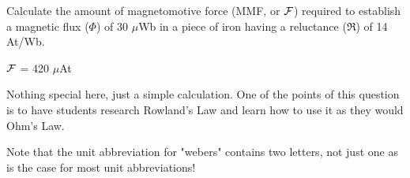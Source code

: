 

Calculate the amount of magnetomotive force (MMF, or $\cal F$) required to establish a magnetic flux ($\Phi$) of 30 $\mu$Wb in a piece of iron having a reluctance ($\Re$) of 14 At/Wb.







$\cal F$ = 420 $\mu$At







Nothing special here, just a simple calculation.  One of the points of this question is to have students research Rowland's Law and learn how to use it as they would Ohm's Law.

Note that the unit abbreviation for "webers" contains two letters, not just one as is the case for most unit abbreviations!




